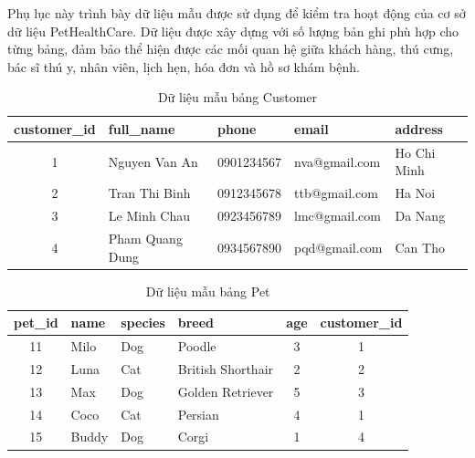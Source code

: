 Phụ lục này trình bày dữ liệu mẫu được sử dụng để kiểm tra hoạt động của cơ sở dữ liệu PetHealthCare. Dữ liệu được xây dựng với số lượng bản ghi phù hợp cho từng bảng, đảm bảo thể hiện được các mối quan hệ giữa khách hàng, thú cưng, bác sĩ thú y, nhân viên, lịch hẹn, hóa đơn và hồ sơ khám bệnh.

\begin{table}[htbp]
    \centering
    \caption{Dữ liệu mẫu bảng Customer}
    \label{tab:data_customer}
    \begin{tabular}{|c|l|l|l|l|}
        \hline
        \textbf{customer\_id} & \textbf{full\_name} & \textbf{phone} &
        \textbf{email} & \textbf{address} \\ \hline

        1 & Nguyen Van An & 0901234567 & nva@gmail.com & Ho Chi Minh \\ \hline
        2 & Tran Thi Binh & 0912345678 & ttb@gmail.com & Ha Noi \\ \hline
        3 & Le Minh Chau & 0923456789 & lmc@gmail.com & Da Nang \\ \hline
        4 & Pham Quang Dung & 0934567890 & pqd@gmail.com & Can Tho \\ \hline

    \end{tabular}
\end{table}

\begin{table}[htbp]
    \centering
    \caption{Dữ liệu mẫu bảng Pet}
    \label{tab:data_pet}
    \begin{tabular}{|c|l|l|l|c|c|}
        \hline
        \textbf{pet\_id} & \textbf{name} & \textbf{species} &
        \textbf{breed} & \textbf{age} & \textbf{customer\_id} \\ \hline

        11 & Milo & Dog & Poodle & 3 & 1 \\ \hline
        12 & Luna & Cat & British Shorthair & 2 & 2 \\ \hline
        13 & Max & Dog & Golden Retriever & 5 & 3 \\ \hline
        14 & Coco & Cat & Persian & 4 & 1 \\ \hline
        15 & Buddy & Dog & Corgi & 1 & 4 \\ \hline

    \end{tabular}
\end{table}


